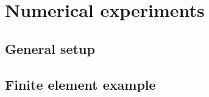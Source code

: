 \section{Numerical experiments}\label{sec:exp}
\subsection{General setup}\label{sec:setup}
\subsection{Finite element example}\label{sec:FEexp}
